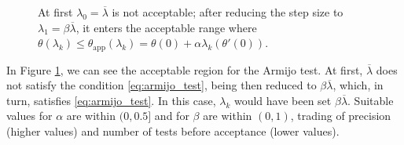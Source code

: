 \begin{figure}[H]
	\caption{At first $\lambda_0 = \overline{\lambda}$ is not acceptable; after reducing the step size to $\lambda_1 = \beta \overline{\lambda}$, it enters the acceptable range where $\theta(\lambda_k) \le \theta_{\text{app}}(\lambda_k)=\theta(0)+\alpha\lambda_k(\theta'(0))$.} \label{fig:armijo_rule}
\end{figure}

%
In Figure \ref{fig:armijo_rule}, we can see the acceptable region for the Armijo test. At first, $\overline{\lambda}$ does not satisfy the condition \eqref{eq:armijo_test}, being then reduced to $\beta\overline{\lambda}$, which, in turn, satisfies \eqref{eq:armijo_test}. In this case, $\lambda_k$ would have been set $\beta\overline{\lambda}$. Suitable values for $\alpha$ are within $(0,0.5]$ and for $\beta$ are within $(0,1)$, trading of precision (higher values) and number of tests before acceptance (lower values).

